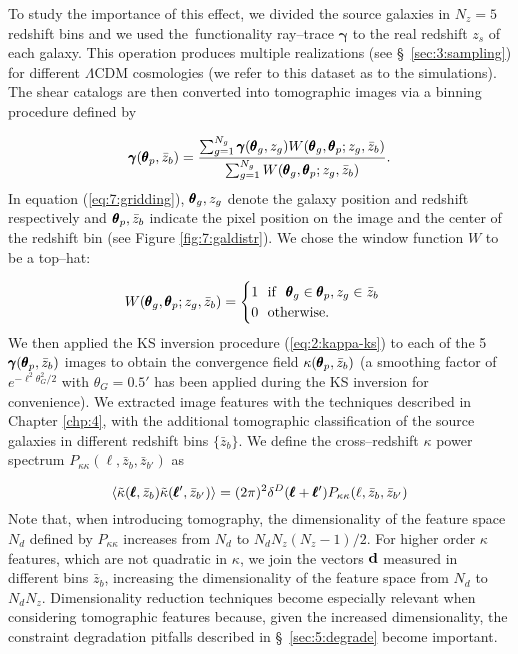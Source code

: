 %
To study the importance of this effect, we divided the source galaxies in $N_z=5$ redshift bins and we used the \LT\,functionality ray--trace $\pmb{\gamma}$ to the real redshift $z_s$ of each galaxy. This operation produces multiple realizations (see \S~\ref{sec:3:sampling}) for different $\Lambda$CDM cosmologies (we refer to this dataset as to the  simulations). The shear catalogs are then converted into tomographic images via a binning procedure defined by

\begin{equation}
\label{eq:7:gridding}
\pmb{\gamma}(\pmb{\theta}_p,\bar{z}_b) = \frac{\sum_{g=1}^{N_g}\pmb{\gamma}(\pmb{\theta}_g,z_g)W(\pmb{\theta}_g,\pmb{\theta}_p;z_g,\bar{z}_b)}{\sum_{g=1}^{N_g}W(\pmb{\theta}_g,\pmb{\theta}_p;z_g,\bar{z}_b)}.
\end{equation}  
%
In equation (\ref{eq:7:gridding}), $\pmb{\theta}_g,z_g$ denote the galaxy position and redshift respectively and $\pmb{\theta}_p,\bar{z}_b$ indicate the pixel position on the image and the center of the redshift bin (see Figure \ref{fig:7:galdistr}). We chose the window function $W$ to be a top--hat: 

\begin{equation}
\label{eq:7:that}
W(\pmb{\theta}_g,\pmb{\theta}_p;z_g,\bar{z}_b) = 
\begin{cases}
1 \,\,\,\, {\rm if} \,\,\,\, \pmb{\theta}_g\in\pmb{\theta}_p,z_g\in\bar{z}_b \\
0 \,\,\,\, {\rm otherwise}.
\end{cases}
\end{equation}
%
We then applied the KS inversion procedure (\ref{eq:2:kappa-ks}) to each of the 5 $\pmb{\gamma}(\pmb{\theta}_p,\bar{z}_b)$ images to obtain the convergence field  $\kappa(\pmb{\theta}_p,\bar{z}_b)$ (a smoothing factor of $e^{-\ell^2\theta_G^2/2}$ with $\theta_G=0.5'$ has been applied during the KS inversion for convenience). We extracted image features with the techniques described in Chapter \ref{chp:4}, with the additional tomographic classification of the source galaxies in different redshift bins $\{\bar{z}_b\}$. We define the cross--redshift $\kappa$ power spectrum $P_{\kappa\kappa}(\ell,\bar{z}_b,\bar{z}_{b'})$ as 

\begin{equation}
\label{eq:7:crosspower}
\left\langle\tilde{\kappa}(\pmb{\ell},\bar{z}_b)\tilde{\kappa}(\pmb{\ell}',\bar{z}_{b'})\right\rangle = (2\pi)^2\delta^D(\pmb{\ell}+\pmb{\ell}')P_{\kappa\kappa}(\ell,\bar{z}_b,\bar{z}_{b'})
\end{equation} 
%
Note that, when introducing tomography, the dimensionality of the feature space $N_d$ defined by $P_{\kappa\kappa}$ increases from $N_d$ to $N_d N_z(N_z-1)/2$. For higher order $\kappa$ features, which are not quadratic in $\kappa$, we join the vectors $\mathbf{d}$ measured in different bins $\bar{z}_b$, increasing the dimensionality of the feature space from $N_d$ to $N_dN_z$. Dimensionality reduction techniques become especially relevant when considering tomographic features because, given the increased dimensionality, the constraint degradation pitfalls described in \S~\ref{sec:5:degrade}  become important. 

